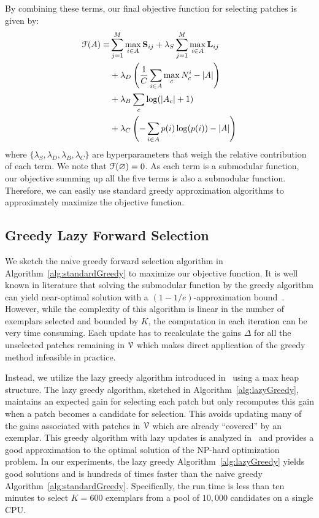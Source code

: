 \documentclass[10pt,twocolumn,letterpaper]{article}
\def\S{{\bf S}}
\begin{document}
By combining these terms, our final objective function for selecting patches
is given by:
\begin{equation}
\begin{split}
  {\cal F}(A) \equiv &  \sum\limits_{j=1}^{M} \max_{i\in A} \S_{ij} + \lambda_{S}\sum\limits_{j=1}^{M} \max_{i\in A} {\bf L}_{ij}  \\
  & + \lambda_D \left( \frac{1}{C} \sum_{i\in A} {\max_c N^i_c} - \vert A \vert \right) \\
  & + \lambda_B \sum_c \log(\vert A_c\vert + 1) \\
  & + \lambda_C \left(-\sum_{i\in A} p(i)\log(p(i)) - \vert A \vert \right) %
\end{split}
\label{eq:obj}
\end{equation}
where $\{\lambda_{S},\lambda_{D},\lambda_{B},\lambda_{C}\}$ are hyperparameters
that weigh the relative contribution of each term.  We note that ${\cal
F}(\varnothing)=0$. As each term is a submodular
function, our objective summing up all the five terms is also a submodular function.
Therefore, we can easily use standard
greedy approximation algorithms to approximately maximize the objective
function.

\subsection{Greedy Lazy Forward Selection}
We sketch the naive greedy forward selection algorithm in
Algorithm~\ref{alg:standardGreedy} to maximize our objective function.
It is well known in literature that solving the submodular function by the
greedy algorithm can yield near-optimal solution with a $(1-1/e)$-approximation
bound~\cite{minoux1978accelerated}.
However, while the complexity of this algorithm is linear
in the number of exemplars selected and bounded by $K$,
the computation in each iteration can be very time consuming.
Each update has to recalculate the gains $\Delta$ for all the unselected
patches remaining in ${\cal V}$ which makes direct application of the greedy
method infeasible in practice.

Instead, we utilize the lazy greedy algorithm introduced
in~\cite{minoux1978accelerated} using a max heap structure.
The lazy greedy algorithm, sketched in Algorithm~\ref{alg:lazyGreedy}, maintains an expected
gain for selecting each patch but only recomputes this gain when a patch becomes a candidate
for selection.  This avoids updating many of the gains associated with patches in ${\cal V}$
which are already ``covered'' by an exemplar.
This greedy algorithm with lazy updates is analyzed in~\cite{minoux1978accelerated}
and provides a good approximation to the optimal solution of the NP-hard
optimization problem.
In our experiments,
the lazy greedy Algorithm~\ref{alg:lazyGreedy} yields good solutions and is
hundreds of times faster than the naive greedy
Algorithm~\ref{alg:standardGreedy}.
Specifically, the run time is less than ten minutes to select $K=600$ exemplars
from a pool of $10,000$ candidates on a single CPU.
\end{document}
